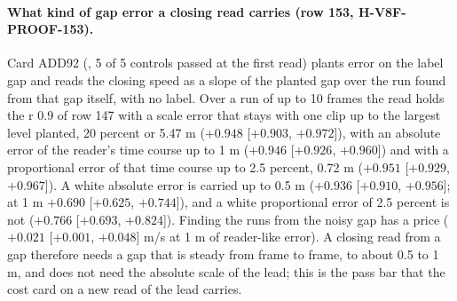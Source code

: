 \paragraph{What kind of gap error a closing read carries (row 153, H-V8F-PROOF-153).} Card ADD92 (, 5 of 5 controls passed at the first read) plants error on the label gap and reads the closing speed as a slope of the planted gap over the run found from that gap itself, with no label. Over a run of up to 10 frames the read holds the r 0.9 of row 147 with a scale error that stays with one clip up to the largest level planted, 20 percent or 5.47 m ($+0.948$ [$+0.903$, $+0.972$]), with an absolute error of the reader's time course up to 1 m ($+0.946$ [$+0.926$, $+0.960$]) and with a proportional error of that time course up to 2.5 percent, 0.72 m ($+0.951$ [$+0.929$, $+0.967$]). A white absolute error is carried up to 0.5 m ($+0.936$ [$+0.910$, $+0.956$]; at 1 m $+0.690$ [$+0.625$, $+0.744$]), and a white proportional error of 2.5 percent is not ($+0.766$ [$+0.693$, $+0.824$]). Finding the runs from the noisy gap has a price ($+0.021$ [$+0.001$, $+0.048$] m/s at 1 m of reader-like error). A closing read from a gap therefore needs a gap that is steady from frame to frame, to about 0.5 to 1 m, and does not need the absolute scale of the lead; this is the pass bar that the cost card on a new read of the lead carries.

